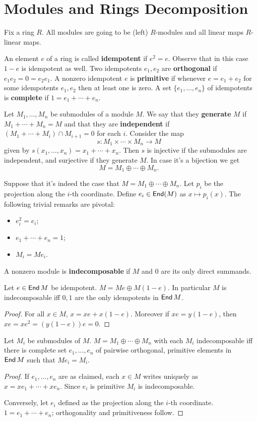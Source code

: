 \section{Modules and Rings Decomposition} 
Fix a ring $R$. All modules are going to be (left) $R$-modules and all linear maps $R$-linear maps.  

An element $e$ of a ring is called \textbf{idempotent} if $e^2=e$. Observe that in this case $1-e$ is idempotent as well. 
Two idempotents $e_1, e_2$ are \textbf{orthogonal} if $e_1 e_2 =0=e_2 e_1$. 
A nonzero idempotent $e$ is \textbf{primitive} if whenever $e=e_1 + e_2$ for some idempotents $e_1, e_2$ then at least one is zero. 
A set $\{e_1, \ldots, e_n\}$ of idempotents is \textbf{complete} if $1=e_1 + \cdots + e_n$. 

Let $M_1, \ldots, M_n$ be submodules of a module $M$. We say that they \textbf{generate} $M$ if $M_1 + \cdots + M_n =M$ and that they are \textbf{independent} if $(M_1 + \cdots+ M_i) \cap M_{i+1} =0$ for each $i$. 
Consider the map 
$$s: M_1 \times \cdots \times M_n \to M$$ 
given by $s(x_1, \ldots, x_n)=x_1 +\cdots + x_n$. 
Then $s$ is injective if the submodules are independent, and surjective if they generate $M$. 
In case it's a bijection we get 
$$M = M_1 \oplus \cdots \oplus M_n\text{.}$$

Suppose that it's indeed the case that $M = M_1 \oplus \cdots \oplus M_n\text{.}$ Let $p_i$ be the projection along the $i$-th coordinate. 
Define $e_i \in \operatorname{\sf{End}}(M)$ as $x \mapsto p_i(x)$. The following trivial remarks are pivotal: 
\begin{itemize}
    \item $e_i ^{2}=e_i$; 
    \item $e_1 + \cdots + e_n =1$; 
    \item $M_i = Me_i$. 
\end{itemize}

A nonzero module is \textbf{indecomposable} if $M$ and $0$ are its only direct summands.

\begin{lem}
Let $e \in \operatorname{\sf{End}} M$ be idempotent. 
$M= Me \oplus M(1-e)$. 
In particular $M$ is indecomposable iff $0,1$ are the only idempotents in $\operatorname{\sf{End}} M$.
\begin{proof}
For all $x \in M$, $x=xe+x(1-e)$. 
Moreover if $xe=y(1-e)$, then $xe=xe^2=(y(1-e))e=0$. 
\end{proof}
\end{lem}

\begin{cor}
Let $M_i$ be submodules of $M$. 
$M=M_1 \oplus \cdots \oplus M_n$ with each $M_i$ indecomposable iff there is  complete set $e_1, \ldots, e_n$ of pairwise orthogonal, primitive elements in $\operatorname{\sf{End}} M$ such that $Me_i =M_i$. 
\begin{proof}
If $e_1, \ldots, e_n$ are as claimed, each $x \in M$ writes uniquely as $x=xe_1 + \cdots + xe_n$. Since $e_i$ is primitive $M_i$ is indecomposable. 

Conversely, let $e_i$ defined as the projection along the $i$-th coordinate. $1=e_1 + \cdots + e_n$; orthogonality and primitiveness follow. 
\end{proof}
\end{cor}

